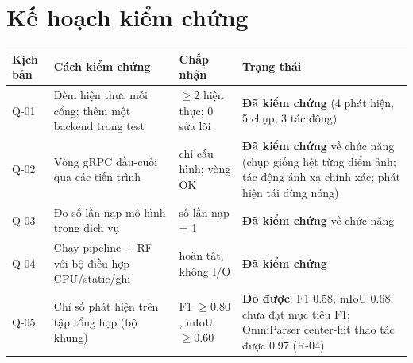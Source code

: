 \documentclass[11pt,a4paper]{report}
\begin{document}
\section{Kế hoạch kiểm chứng}
\begin{longtable}{@{}p{2.0cm}p{5.4cm}p{4.4cm}p{2.2cm}@{}}
\toprule
\textbf{Kịch bản} & \textbf{Cách kiểm chứng} & \textbf{Chấp nhận} & \textbf{Trạng thái} \\
\midrule
\endhead
Q-01 & Đếm hiện thực mỗi cổng; thêm một backend trong test & $\geq 2$ hiện thực; 0 sửa lõi & \textbf{Đã kiểm chứng} (4 phát hiện, 5 chụp, 3 tác động) \\
Q-02 & Vòng gRPC đầu-cuối qua các tiến trình & chỉ cấu hình; vòng OK & \textbf{Đã kiểm chứng} về chức năng (chụp giống hệt từng điểm ảnh; tác động ánh xạ chính xác; phát hiện tái dùng nóng) \\
Q-03 & Đo số lần nạp mô hình trong dịch vụ & số lần nạp = 1 & \textbf{Đã kiểm chứng} về chức năng \\
Q-04 & Chạy pipeline + RF với bộ điều hợp CPU/static/ghi & hoàn tất, không I/O & \textbf{Đã kiểm chứng} \\
Q-05 & Chỉ số phát hiện trên tập tổng hợp (bộ khung) & F1 $\geq 0.80$, mIoU $\geq 0.60$ & \textbf{Đo được}: F1 0.58, mIoU 0.68; chưa đạt mục tiêu F1; OmniParser center-hit thao tác được 0.97 (R-04) \\
\bottomrule
\end{longtable}

\end{document}
